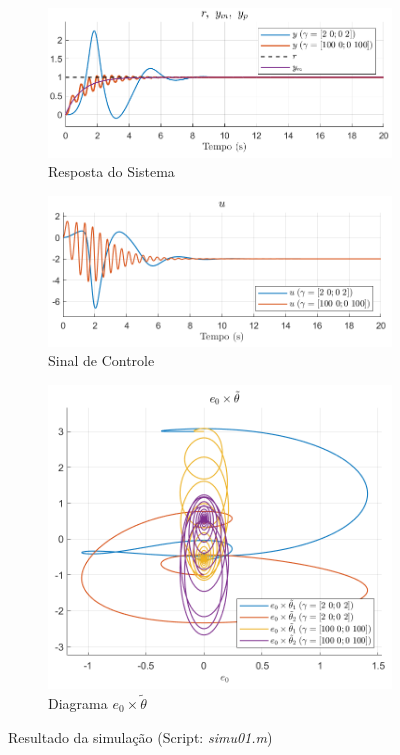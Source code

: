 \documentclass[10pt]{article}
\begin{document}
\begin{figure}[h!]
    \begin{subfigure}[b]{0.3\textwidth}
        \centering
        \includegraphics[width=\textwidth]{img/fig01c.png}
        \caption{Resposta do Sistema}
    \end{subfigure}
    \begin{subfigure}[b]{0.3\textwidth}
        \centering
        \includegraphics[width=\textwidth]{img/fig01e.png}
        \caption{Sinal de Controle}
    \end{subfigure}

    \begin{subfigure}[b]{0.3\textwidth}
        \centering
        \includegraphics[width=\textwidth]{img/fig01d.png}
        \caption{Diagrama $e_0 \times \tilde{\theta}$}
    \end{subfigure}

    \caption{Resultado da simulação (Script: \textit{simu01.m})}
    \label{fig:sim1}
\end{figure}
\end{document}
